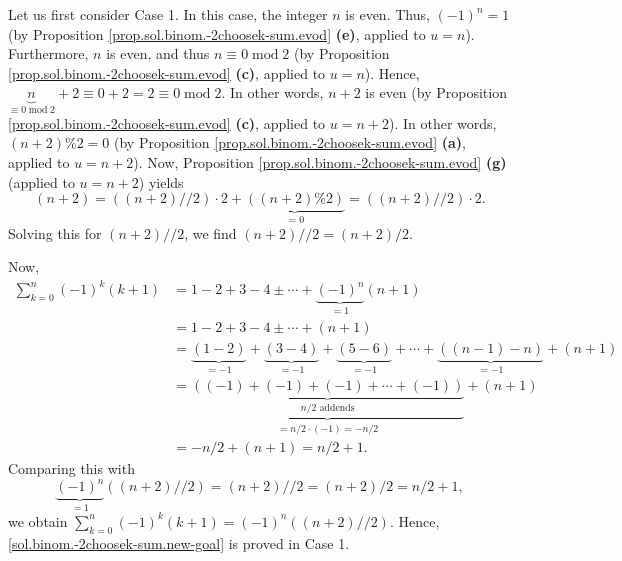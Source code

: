 \documentclass[paper=a4, fontsize=12pt]{scrartcl}%
\let\sumnonlimits\sum
\renewcommand{\sum}{\sumnonlimits\limits}
\theoremstyle{plainsl}
\theoremstyle{definition}
\theoremstyle{remark}
\begin{document}
Let us first consider Case 1. In this case, the integer $n$ is even. Thus,
$\left(  -1\right)  ^{n}=1$ (by Proposition
\ref{prop.sol.binom.-2choosek-sum.evod} \textbf{(e)}, applied to $u=n$).
Furthermore, $n$ is even, and thus $n\equiv0\operatorname{mod}2$ (by
Proposition \ref{prop.sol.binom.-2choosek-sum.evod} \textbf{(c)}, applied to
$u=n$). Hence, $\underbrace{n}_{\equiv0\operatorname{mod}2}+2\equiv
0+2=2\equiv0\operatorname{mod}2$. In other words, $n+2$ is even (by
Proposition \ref{prop.sol.binom.-2choosek-sum.evod} \textbf{(c)}, applied to
$u=n+2$). In other words, $\left(  n+2\right)  \%2=0$ (by Proposition
\ref{prop.sol.binom.-2choosek-sum.evod} \textbf{(a)}, applied to $u=n+2$).
Now, Proposition \ref{prop.sol.binom.-2choosek-sum.evod} \textbf{(g)} (applied
to $u=n+2$) yields
\[
\left(  n+2\right)  =\left(  \left(  n+2\right)  //2\right)  \cdot
2+\underbrace{\left(  \left(  n+2\right)  \%2\right)  }_{=0}=\left(  \left(
n+2\right)  //2\right)  \cdot2.
\]
Solving this for $\left(  n+2\right)  //2$, we find $\left(  n+2\right)
//2=\left(  n+2\right)  /2$.

Now,%
\begin{align*}
\sum_{k=0}^{n}\left(  -1\right)  ^{k}\left(  k+1\right)   &  =1-2+3-4\pm
\cdots+\underbrace{\left(  -1\right)  ^{n}}_{=1}\left(  n+1\right) \\
&  =1-2+3-4\pm\cdots+\left(  n+1\right) \\
&  =\underbrace{\left(  1-2\right)  }_{=-1}+\underbrace{\left(  3-4\right)
}_{=-1}+\underbrace{\left(  5-6\right)  }_{=-1}+\cdots+\underbrace{\left(
\left(  n-1\right)  -n\right)  }_{=-1}+\left(  n+1\right) \\
&  =\underbrace{\underbrace{\left(  \left(  -1\right)  +\left(  -1\right)
+\left(  -1\right)  +\cdots+\left(  -1\right)  \right)  }_{n/2\text{ addends}%
}}_{=n/2\cdot\left(  -1\right)  =-n/2}+\left(  n+1\right) \\
&  =-n/2+\left(  n+1\right)  =n/2+1.
\end{align*}
Comparing this with%
\[
\underbrace{\left(  -1\right)  ^{n}}_{=1}\left(  \left(  n+2\right)
//2\right)  =\left(  n+2\right)  //2=\left(  n+2\right)  /2=n/2+1,
\]
we obtain $\sum_{k=0}^{n}\left(  -1\right)  ^{k}\left(  k+1\right)  =
\left(-1\right)^n \left(\left( n+2\right)  //2\right)$.
Hence, \eqref{sol.binom.-2choosek-sum.new-goal} is proved in Case 1.
\end{document}
